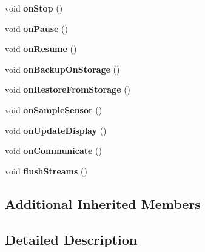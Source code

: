 \begin{DoxyCompactItemize}
void {\bfseries on\+Stop} ()
\item 
\mbox{\label{classwood_box_1_1module_1_1_wood_box_module_a55bfd3c23c7be2b757db22b3db7d1bc5}} 
void {\bfseries on\+Pause} ()
\item 
\mbox{\label{classwood_box_1_1module_1_1_wood_box_module_ac6c8420f517a8ce3acf98ceda5827bac}} 
void {\bfseries on\+Resume} ()
\item 
\mbox{\label{classwood_box_1_1module_1_1_wood_box_module_a28c9b89bc3429d6e78fa38698c78d553}} 
void {\bfseries on\+Backup\+On\+Storage} ()
\item 
\mbox{\label{classwood_box_1_1module_1_1_wood_box_module_a89395caa73cadc63c576931b45400c2d}} 
void {\bfseries on\+Restore\+From\+Storage} ()
\item 
\mbox{\label{classwood_box_1_1module_1_1_wood_box_module_a227e8b23e8435f622f4d59eb6847e98b}} 
void {\bfseries on\+Sample\+Sensor} ()
\item 
\mbox{\label{classwood_box_1_1module_1_1_wood_box_module_a1461bd1a53529065541c87fc03a28f57}} 
void {\bfseries on\+Update\+Display} ()
\item 
\mbox{\label{classwood_box_1_1module_1_1_wood_box_module_acacb4ac748c70bd1f172d9a87e07dfbf}} 
void {\bfseries on\+Communicate} ()
\item 
\mbox{\label{classwood_box_1_1module_1_1_wood_box_module_a240ad6ff3f905a531fcc62670a26a6fa}} 
void {\bfseries flush\+Streams} ()
\end{DoxyCompactItemize}
\subsection*{Additional Inherited Members}


\subsection{Detailed Description}
